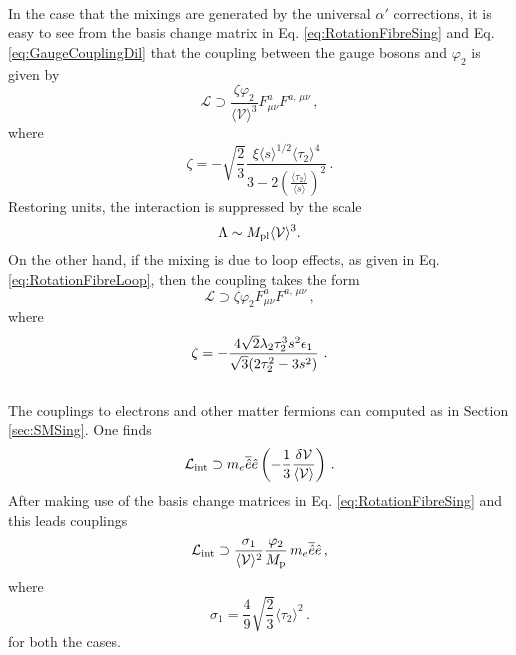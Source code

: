 \documentclass[11pt,a4paper]{article}
\newcommand{\be}{\begin{equation}}
\newcommand{\ee}{\end{equation}}
\newcommand{\V}{\mathcal{V}}
\begin{document}
\\  In the case that the mixings are generated by the universal $\alpha'$ corrections, it is easy to see from the basis change matrix in Eq. \eqref{eq:RotationFibreSing} and Eq. \eqref{eq:GaugeCouplingDil} that the coupling between the gauge bosons and $\varphi_2$ is given by
%
\begin{equation}
\mathcal{L} \supset \frac{\zeta \varphi_2}{\langle\V\rangle^3} F^a_{\mu \nu} F^{a,\,\mu \nu} \,,
\end{equation}
%
where
%
\begin{equation}
\zeta = - \sqrt{\frac{2}{3}} \frac{\xi \langle s \rangle^{1/2} \langle \tau_2 \rangle^4}{3 - 2 \left(\frac{\langle \tau_2 \rangle}{\langle s \rangle}\right)^2} \,.
\end{equation}
%
Restoring units, the interaction is suppressed by the scale 
%
\be
\label{supr}
  \Lambda \sim M_{\rm pl} \langle\V\rangle^3.
\ee
%
On the other hand, if the mixing is due to loop effects, as given in Eq. \eqref{eq:RotationFibreLoop}, then the coupling takes the form
\begin{equation}
\label{eq:CouplingsLoopFibre}
\mathcal{L} \supset \zeta \varphi_2 F^a_{\mu \nu} F^{a,\,\mu \nu} \,,
\end{equation}
where
\begin{equation}
\label{lmixdanger}
\zeta = - {4 \sqrt{2} \lambda_2 \tau_2^3 s^{2} \epsilon_1 \over {\sqrt{3} (2 \tau_2^2  - 3s^2)}} \ .
\end{equation}
%
\\ 
%
The couplings to electrons and other matter fermions can computed as in Section \ref{sec:SMSing}. One finds
%
  \begin{equation}
\mathcal{L}_{\rm int} \supset m_e \overline{\hat{e}} \hat{e} \left(-\frac{1}{3} \frac{\delta \V}{\langle \V \rangle}\right) \,.
\end{equation}
%
After making use of the  basis change matrices in Eq. \eqref{eq:RotationFibreSing} and \label{eq:RotationFibreLoop} this leads couplings
\begin{equation}
\label{eq:MatterCouplingFibreSing}
\mathcal{L}_{\rm int} \supset \frac{\sigma_1}{\langle \V \rangle^2} \frac{\varphi_2}{M_{\rm p}} \, m_e \overline{\hat{e}} \hat{e} \,,
\end{equation}
where
%
\begin{equation}
\label{fsuni}
\sigma_1 = \frac{4}{9} \sqrt{\frac{2}{3}} \langle \tau_2 \rangle^2 \,.
\end{equation}
%
for both the cases.
\end{document}

